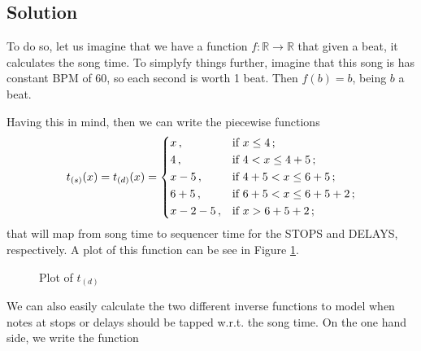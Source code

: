 \documentclass[a4paper,9pt]{article}
\begin{document}
    \subsection{Solution}

    To do so, let us imagine that we have a function $ f : \mathbb{R}\rightarrow \mathbb{R}$ that given a beat, it calculates the song time. To simplyfy things further, imagine that this song is has constant BPM of 60, so each second is worth 1 beat. Then $ f(b) = b $, being $ b $ a beat.

    Having this in mind, then we can write the piecewise functions
    \begin{equation}
	    t_{(s)}(x) = t_{(d)}(x) = \begin{dcases}
		    x\,, & \text{if $ x \leq 4 $}\,; \\
		    4\,, & \text{if $4 <  x \leq 4+5 $}\,; \\
		    x-5\,, & \text{if $4 + 5 <  x \leq 6 + 5 $}\,; \\
		    6+5\,, & \text{if $6 + 5 <  x \leq 6 + 5+ 2 $}\,; \\
		    x-2-5\,, & \text{if $ x > 6+5+2 $}\,; \\
	    \end{dcases}
	    \label{l}
    \end{equation}
    that will map from song time to sequencer time for the STOPS and DELAYS, respectively. A plot of this function can be see in Figure \ref{fig:songtime2seqtime}. 
    
\begin{figure}[htpb]
	\centering

\caption{Plot of $t_{(d)}$ }
	\label{fig:songtime2seqtime}
\end{figure}

We can also easily  calculate the two different inverse functions to model when notes at stops or delays should be tapped w.r.t. the song time. On the one hand side, we write the function
\end{document}
